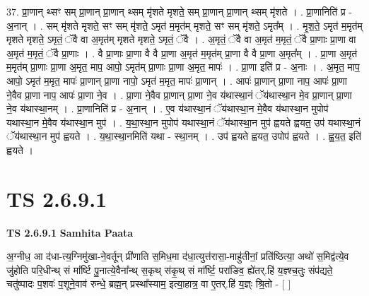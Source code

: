 \documentclass[17pt]{extarticle}
\begin{document}
37. प्रा॒णान् थ्सꣳ सम् प्रा॒णान् प्रा॒णान् थ्सम् मृ॑शते मृशते॒ सम् प्रा॒णान् प्रा॒णान् थ्सम् मृ॑शते । . प्रा॒णानिति॑ प्र - अ॒नान् । . सम् मृ॑शते मृशते॒ सꣳ सम् मृ॑शते॒ ऽमृत॑ म॒मृत॑म् मृशते॒ सꣳ सम् मृ॑शते॒ ऽमृत᳚म् । . मृ॒श॒ते॒ ऽमृत॑ म॒मृत॑म् मृशते मृशते॒ ऽमृतं॒ ॅवै वा अ॒मृत॑म् मृशते मृशते॒ ऽमृतं॒ ॅवै । . अ॒मृतं॒ ॅवै वा अ॒मृत॑ म॒मृतं॒ ॅवै प्रा॒णाः प्रा॒णा वा अ॒मृत॑ म॒मृतं॒ ॅवै प्रा॒णाः । . वै प्रा॒णाः प्रा॒णा वै वै प्रा॒णा अ॒मृत॑ म॒मृत॑म् प्रा॒णा वै वै प्रा॒णा अ॒मृत᳚म् । . प्रा॒णा अ॒मृत॑ म॒मृत॑म् प्रा॒णाः प्रा॒णा अ॒मृत॒ माप॒ आपो॒ ऽमृत॑म् प्रा॒णाः प्रा॒णा अ॒मृत॒ मापः॑ । . प्रा॒णा इति॑ प्र - अ॒नाः । . अ॒मृत॒ माप॒ आपो॒ ऽमृत॑ म॒मृत॒ मापः॑ प्रा॒णान् प्रा॒णा नापो॒ ऽमृत॑ म॒मृत॒ मापः॑ प्रा॒णान् । . आपः॑ प्रा॒णान् प्रा॒णा नाप॒ आपः॑ प्रा॒णा ने॒वैव प्रा॒णा नाप॒ आपः॑ प्रा॒णा ने॒व । . प्रा॒णा ने॒वैव प्रा॒णान् प्रा॒णा ने॒व य॑थास्था॒नं ॅय॑थास्था॒न मे॒व प्रा॒णान् प्रा॒णा ने॒व य॑थास्था॒नम् । . प्रा॒णानिति॑ प्र - अ॒नान् । . ए॒व य॑थास्था॒नं ॅय॑थास्था॒न मे॒वैव य॑थास्था॒न मुपोप॑ यथास्था॒न मे॒वैव य॑थास्था॒न मुप॑ । . य॒था॒स्था॒न मुपोप॑ यथास्था॒नं ॅय॑थास्था॒न मुप॑ ह्वयते ह्वयत॒ उप॑ यथास्था॒नं ॅय॑थास्था॒न मुप॑ ह्वयते । . य॒था॒स्था॒नमिति॑ यथा - स्था॒नम् । . उप॑ ह्वयते ह्वयत॒ उपोप॑ ह्वयते । . ह्व॒य॒त॒ इति॑ ह्वयते । \newline
\pagebreak
{}
\section*{ TS 2.6.9.1 }

\textbf{TS 2.6.9.1 } \newline
\textbf{Samhita Paata} \newline

अ॒ग्नीध॒ आ द॑धा-त्य॒ग्निमु॑खा-ने॒वर्तून् प्री॑णाति स॒मिध॒मा द॑धा॒त्युत्त॑रासा॒-माहु॑तीनां॒ प्रति॑ष्ठित्या॒ अथो॑ स॒मिद्व॑त्ये॒व जु॑होति परि॒धीन्थ् सं मा᳚र्ष्टि पु॒नात्ये॒वैना᳚न्थ् स॒कृथ् स॑कृ॒थ् सं मा᳚र्ष्टि॒ परा॑ङिव॒ ह्ये॑तर्.हि॑ य॒ज्ञ्श्च॒तुः संप॑द्यते॒ चतु॑ष्पादः प॒शवः॑ प॒शूने॒वाव॑ रुन्धे॒ ब्रह्म॒न् प्रस्था᳚स्याम॒ इत्या॒हात्र॒ वा ए॒तर्.हि॑ य॒ज्ञ्ः श्रि॒तो - [  ] \newline
\end{document}
